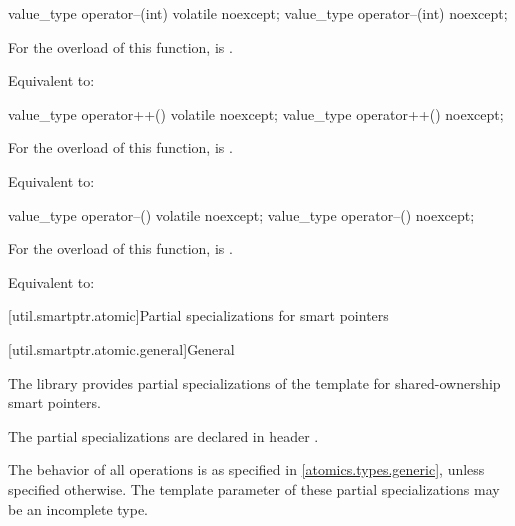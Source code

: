 %
%
\begin{itemdecl}
value_type operator--(int) volatile noexcept;
value_type operator--(int) noexcept;
\end{itemdecl}

\begin{itemdescr}
\pnum
\constraints
For the  overload of this function,
 is .

\pnum
\effects
Equivalent to: 
\end{itemdescr}

%
%
\begin{itemdecl}
value_type operator++() volatile noexcept;
value_type operator++() noexcept;
\end{itemdecl}

\begin{itemdescr}
\pnum
\constraints
For the  overload of this function,
 is .

\pnum
\effects
Equivalent to: 
\end{itemdescr}

%
%
\begin{itemdecl}
value_type operator--() volatile noexcept;
value_type operator--() noexcept;
\end{itemdecl}

\begin{itemdescr}
\pnum
\constraints
For the  overload of this function,
 is .

\pnum
\effects
Equivalent to: 
\end{itemdescr}

[util.smartptr.atomic]{Partial specializations for smart pointers}%
%

[util.smartptr.atomic.general]{General}

\pnum
The library provides partial specializations of the  template
for shared-ownership smart pointers.
\begin{note}
The partial specializations are declared in header .
\end{note}
The behavior of all operations is as specified in \ref{atomics.types.generic},
unless specified otherwise.
The template parameter  of these partial specializations
may be an incomplete type.

